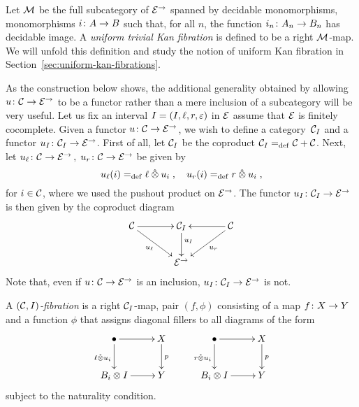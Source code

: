 \documentclass[reqno,10pt,a4paper,oneside]{amsart}
\begin{document}
\begin{example}  \label{exa-triv-kan-fib}
Let $\cal{M}$ be the full subcategory of $\cal{E}^\to$ spanned by decidable mo\-no\-mor\-phisms, \ie
mo\-no\-mor\-phisms $i \co A \to B$ such that, for all $n$, the function $i_n \co A_n \to B_n$ has decidable
image. A \emph{uniform trivial Kan fibration} is defined to be a right $\cal{M}$-map. We will unfold this
definition and study the notion of uniform Kan fibration in Section~\ref{sec:uniform-kan-fibrations}.
\end{example}

\medskip


As the construction below shows, the additional generality obtained by allowing $u \co \cal{C} \to \catE^\to$ to be a functor rather than a mere inclusion of a  subcategory will be very useful.  Let us fix an interval $\interval = (\interval,  \intervall, \intervalr, \varepsilon)$ in $\catE$ assume that $\catE$ is finitely cocomplete. Given a functor $u \co \cal{C} \to \catE^\to$, we wish to define a category~$\cal{C}_\interval$ and a functor $u_\interval \co \cal{C}_\interval \to \catE^\to$. First of all, let $\cal{C}_\interval$ be the coproduct $\cal{C}_\interval  \defeq \cal{C} + \cal{C}$.
 Next, let $u_{\intervall} \co \cal{C} \to \catE^\to \, , \; u_{\intervalr} \co \cal{C} \to \catE^\to$ be given by
 \[
u_{\intervall}(i) \defeq  \intervall \hatotimes u_i \; , \quad
u_{\intervalr}(i) \defeq  \intervalr \hatotimes u_i \; , 
\]
for $i \in \cal{C}$, where we used the pushout product on $\catE^\to$. The functor $u_\interval \co \cal{C}_\interval \to \catE^\to$ is then given by the coproduct diagram
\begin{equation}
\label{equ:u-interval}
\vcenter{\hbox{\xymatrix@C=1.2cm{
\cal{C} \ar[r] \ar[dr]_-{u_\intervall} & \cal{C}_\interval \ar[d]^(.4){u_\interval} & \cal{C} \ar[dl]^-{u_\intervalr} \ar[l] \\ 
 & \catE^\to }}}
\end{equation}
Note that, even if $u \co \cal{C} \to \catE^\to$ is an inclusion, $u_\interval \co \cal{C}_\interval \to \catE^\to$ is not.





\begin{definition} A \emph{$(\cal{C}, \interval)$-fibration} is a right $\cal{C}_\interval$-map, \ie pair $(f, \phi)$ consisting of a map $f \co X \to Y$ and a function $\phi$ that assigns diagonal fillers to all diagrams of the form
\[
\xymatrix{
\bullet \ar[r] \ar[d]_{\intervall \hatotimes u_i} & X \ar[d]^p \\
B_i \otimes \interval \ar[r] & Y} \qquad \xymatrix{
\bullet \ar[r] \ar[d]_{\intervalr \hatotimes u_i} & X \ar[d]^p \\
B_i \otimes \interval \ar[r] & Y}
\]
subject to the naturality condition. 
\end{definition}
\end{document}
